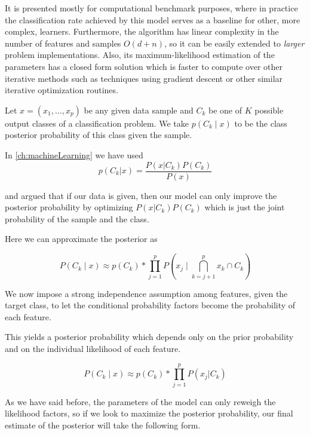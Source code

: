 It is presented mostly for computational benchmark purposes, where in practice the classification rate achieved by this model serves as a baseline for other, more complex, learners. 
Furthermore, the algorithm has linear complexity in the number of features and samples $O(d+n)$, so it can be easily extended to \textit{larger} problem implementations. 
Also, its maximum-likelihood estimation of the parameters has a closed form solution which is faster to compute over other iterative methods such as techniques using gradient descent or other similar iterative optimization routines.

Let $x = (x_1,\ldots,x_p)$ be any given data sample and $C_k$ be one of $K$ possible output classes of a classification problem. 
We take $p(C_k \mid x)$ to be the class posterior probability of this class given the sample.

In \cref{ch:machineLearning}
we have used
\begin{equation}
p(C_k| x) = \frac{P(x|C_k)P(C_k)}{P(x)}
\end{equation}\label{eq:equation-posteriorProbabilties}


and argued that if our data is given, then our model can only improve the posterior probability by optimizing $P(x|C_k)P(C_k)$ which is just the joint probability of the sample and the class.

Here we can approximate the posterior as

\begin{equation}
P(C_k \mid x) \approx p(C_k) * \prod_{j=1}^{p}  P(x_j \mid \bigcap_{k=j+1}^{p} x_k \cap C_k)
\end{equation}\label{eq:posteriorProbabilityDecomposition1}


We now impose a strong independence assumption among features, given the target class, to let the conditional probability factors become the probability of each feature. %

This yields a posterior probability which depends only on the prior probability and on the individual likelihood of each feature.

\begin{equation}
P(C_k \mid x) \approx p(C_k) * \prod_{j=1}^{p}  P(x_j | C_k)
\end{equation}\label{eq:posteriorProbabilityDecomposition2}

As we have said before, the parameters of the model can only reweigh the likelihood factors, so if we look to maximize the posterior probability, our final estimate of the posterior will take the following form.

